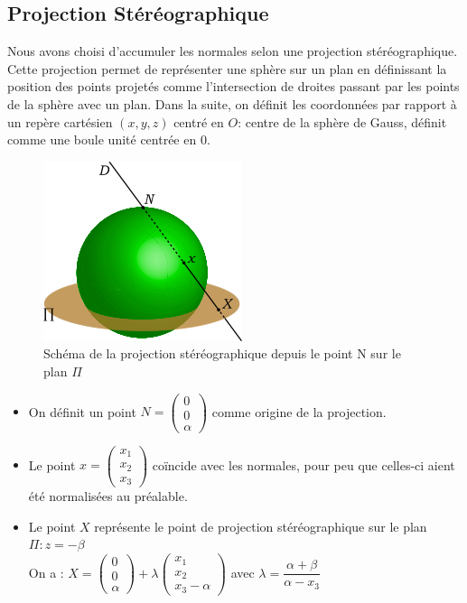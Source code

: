\documentclass{article}
\begin{document}
\subsection{Projection Stéréographique}

Nous avons choisi d'accumuler les normales selon une projection stéréographique. 
Cette projection permet de représenter une sphère sur un plan en définissant la position des 
points projetés comme l'intersection de droites passant par les points de la sphère avec un plan.
Dans la suite, on définit les coordonnées par rapport à un repère cartésien $(x,y,z)$ centré en $O$: centre de la sphère de Gauss, définit comme une boule unité centrée en 0.


\begin{figure}[H]
    \begin{center}
        \includegraphics[width=.5\linewidth]{../220px-Stereo.png}
    \end{center}
    \caption{Schéma de la projection stéréographique depuis le point N sur le plan $\Pi$}
    \label{fig:gauss_sphere_schema}
\end{figure}


\begin{itemize}
\item On définit un point $N=\left(\begin{array}{l}0\\ 0\\ \alpha\end{array}\right)$ comme origine de la projection.
\item Le point $x=\left(\begin{array}{l}x_1\\ x_2\\ x_3\end{array}\right)$ coïncide avec les normales, pour peu que celles-ci aient été normalisées au préalable.
\item Le point $X$ représente le point de projection stéréographique sur le plan $\Pi : z=-\beta$\\
On a : $X = \left(\begin{array}{l}0\\ 0\\ \alpha\end{array}\right)+\lambda\left(\begin{array}{l}x_1\\ x_2\\ x_3-\alpha\end{array}\right)$
avec $\lambda = \dfrac{\alpha+\beta}{\alpha-x_3}$
\end{itemize}
\end{document}
